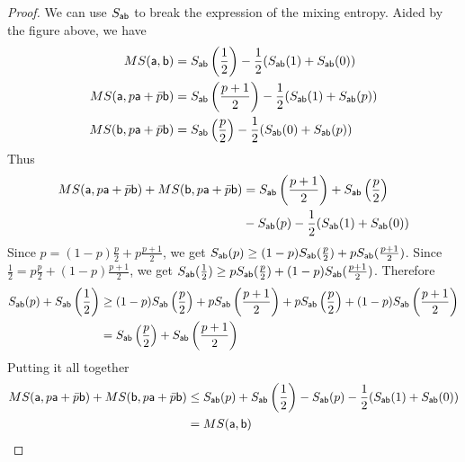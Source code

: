 \begin{mathSection}
\begin{proof}
	We can use $S_{\ens[a]\ens[b]}$ to break the expression of the mixing entropy. Aided by the figure above, we have
	\begin{equation}
		\begin{aligned}
			MS(\ens[a],\ens[b]) &= S_{\ens[a]\ens[b]}\left(\frac{1}{2}\right)-\frac{1}{2}(S_{\ens[a]\ens[b]}(1)+S_{\ens[a]\ens[b]}(0)) \\
			MS(\ens[a],p\ens[a]+\bar{p}\ens[b]) &= S_{\ens[a]\ens[b]}\left(\frac{p+1}{2}\right)-\frac{1}{2}(S_{\ens[a]\ens[b]}(1)+S_{\ens[a]\ens[b]}(p)) \\
			MS(\ens[b],p\ens[a]+\bar{p}\ens[b]) &= S_{\ens[a]\ens[b]}\left(\frac{p}{2}\right)-\frac{1}{2}(S_{\ens[a]\ens[b]}(0)+S_{\ens[a]\ens[b]}(p))
		\end{aligned}
	\end{equation}
	Thus
	\begin{equation}
		\begin{aligned}
			MS(\ens[a],p\ens[a]+\bar{p}\ens[b]) + MS(\ens[b],p\ens[a]+\bar{p}\ens[b]) &= S_{\ens[a]\ens[b]}\left(\frac{p+1}{2}\right)+S_{\ens[a]\ens[b]}\left(\frac{p}{2}\right)\\&-S_{\ens[a]\ens[b]}(p)-\frac{1}{2}(S_{\ens[a]\ens[b]}(1)+S_{\ens[a]\ens[b]}(0))
		\end{aligned}
	\end{equation}
	Since $p = (1-p)\frac{p}{2} + p\frac{p+1}{2}$, we get $S_{\ens[a]\ens[b]}(p) \ge (1-p)S_{\ens[a]\ens[b]}(\frac{p}{2}) + pS_{\ens[a]\ens[b]}(\frac{p+1}{2})$. Since $\frac{1}{2} = p\frac{p}{2} + (1-p)\frac{p+1}{2}$, we get $S_{\ens[a]\ens[b]}(\frac{1}{2}) \ge pS_{\ens[a]\ens[b]}(\frac{p}{2}) + (1-p)S_{\ens[a]\ens[b]}(\frac{p+1}{2})$. Therefore
	\begin{equation}
		\begin{aligned}
			S_{\ens[a]\ens[b]}(p) + S_{\ens[a]\ens[b]}\left(\frac{1}{2}\right) &\ge (1-p)S_{\ens[a]\ens[b]}\left(\frac{p}{2}\right) + pS_{\ens[a]\ens[b]}\left(\frac{p+1}{2}\right) + pS_{\ens[a]\ens[b]}\left(\frac{p}{2}\right) + (1-p)S_{\ens[a]\ens[b]}\left(\frac{p+1}{2}\right) \\ &= S_{\ens[a]\ens[b]}\left(\frac{p}{2}\right) + S_{\ens[a]\ens[b]}\left(\frac{p+1}{2}\right)
		\end{aligned}
	\end{equation}
	Putting it all together
	\begin{equation}
		\begin{aligned}
			MS(\ens[a],p\ens[a]+\bar{p}\ens[b]) + MS(\ens[b],p\ens[a]+\bar{p}\ens[b]) &\le S_{\ens[a]\ens[b]}(p) + S_{\ens[a]\ens[b]}\left(\frac{1}{2}\right) - S_{\ens[a]\ens[b]}(p) - \frac{1}{2}(S_{\ens[a]\ens[b]}(1) + S_{\ens[a]\ens[b]}(0)) \\ &= MS(\ens[a],\ens[b])
		\end{aligned}
	\end{equation}
	

\end{proof}
\end{mathSection}
